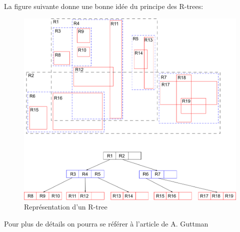 \documentclass[11pt,a4paper,utf8x]{report}
\begin{document}
La figure suivante donne une bonne idée du principe des R-trees\cite{wiki}:
\begin{figure}[htbp]
\centering
\includegraphics[scale=0.50]{rtree}
\caption{Représentation d'un R-tree}
\label{fig:rtree}
\end{figure}

Pour plus de détails on pourra se référer à l'article de A. Guttman \cite{Guttman}

\appendix


\end{document}
